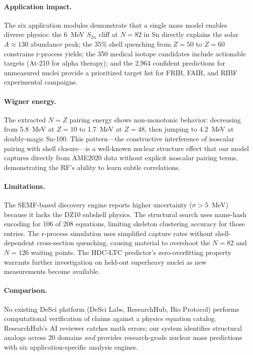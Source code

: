 \documentclass[letterpaper,11pt]{article}
\begin{document}
\paragraph{Application impact.} The six application modules demonstrate that a
single mass model enables diverse physics: the 6~MeV $S_{2n}$ cliff at $N = 82$
in Sn directly explains the solar $A \approx 130$ abundance peak; the 35\%
shell quenching from $Z = 50$ to $Z = 60$ constrains r-process yields; the 350
medical isotope candidates include actionable targets (At-210 for alpha therapy);
and the 2,964 confident predictions for unmeasured nuclei provide a prioritized
target list for FRIB, FAIR, and RIBF experimental campaigns.

\paragraph{Wigner energy.} The extracted $N = Z$ pairing energy shows
non-monotonic behavior: decreasing from 5.8~MeV at $Z = 10$ to 1.7~MeV at
$Z = 48$, then jumping to 4.2~MeV at doubly-magic Sn-100. This pattern---the
constructive interference of isoscalar pairing with shell closure---is a
well-known nuclear structure effect that our model captures directly from AME2020
data without explicit isoscalar pairing terms, demonstrating the RF's ability to
learn subtle correlations.

\paragraph{Limitations.} The SEMF-based discovery engine reports higher
uncertainty ($\sigma > 5$~MeV) because it lacks the DZ10 subshell physics. The
structural search uses name-hash encoding for 106 of 208 equations, limiting
skeleton clustering accuracy for those entries. The r-process simulation uses
simplified capture rates without shell-dependent cross-section quenching, causing
material to overshoot the $N = 82$ and $N = 126$ waiting points. The HDC-LTC
predictor's zero-overfitting property warrants further investigation on held-out
superheavy nuclei as new measurements become available.

\paragraph{Comparison.} No existing DeSci platform (DeSci Labs, ResearchHub,
Bio Protocol) performs computational verification of claims against a physics
equation catalog. ResearchHub's AI reviewer catches math errors; our system
identifies structural analogs across 20 domains \emph{and} provides
research-grade nuclear mass predictions with six application-specific analysis
engines.
\end{document}
